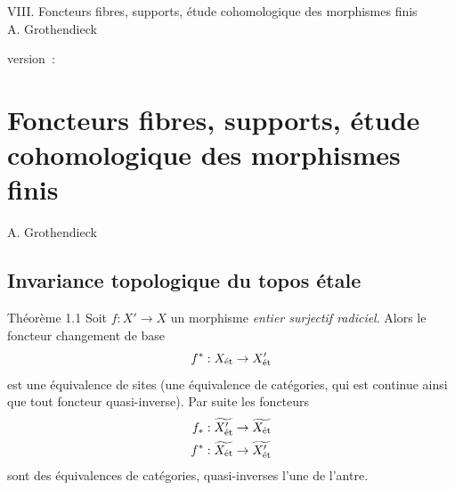 \documentclass[10pt]{../fichiers-configuration-latex/smfart}
\begin{document}
\begin{center}
VIII. Foncteurs fibres, supports, étude cohomologique des morphismes finis\\
A. Grothendieck
\end{center}

version : \showgitstatus{}
\tableofcontents

\else
\chapter{Foncteurs fibres, supports, étude cohomologique des morphismes finis}
\begin{center}
A. Grothendieck
\end{center}
\fi

\setcounter{pageoriginal}{366}


\section{Invariance topologique du topos
  étale}

\begin{enonce*}{Théorème 1.1}
Soit \pageoriginale  $f : X'\to X$ un morphisme \emph{entier surjectif
radiciel}. Alors le foncteur changement de base
$$
f^{\ast} : X_{\text{\rm ét}} \to X'_{\text{\rm ét}}
$$
est une équivalence de sites (\ie une équivalence de catégories, qui
est continue ainsi que tout foncteur quasi-inverse). Par suite les
foncteurs
\begin{align*}
f_{\ast} : \widetilde{X'_{\text{\rm ét}}} &\to \widetilde{X_{\text{\rm ét}}}\\
f^{\ast} : \widetilde{X_{\text{\rm ét}}} &\to \widetilde{X'_{\text{\rm
      ét}}}
\end{align*}
sont des équivalences de catégories, quasi-inverses l'une de l'antre.
\end{enonce*}
\end{document}
